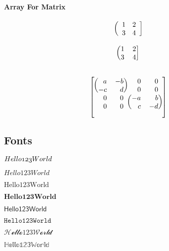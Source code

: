 \paragraph{Array For Matrix}
\[
    \begin{array}({cc}]     %
        1 & 2 \\
        3 & 4
    \end{array}
\]


\[
    \begin{blockarray}{(cc]}    %
        1 & 2 \\
        3 & 4
    \end{blockarray}
\]

\[ \left[
    \begin{blockarray}{*4r}     %
        \begin{block}{(rr)rr}
            a & -b & 0 & 0 \\
            -c & d & 0 & 0 \\
        \end{block}
        \begin{block}{rr(rr)}
            0 & 0 & -a & b \\
            0 & 0 & c & -d \\
        \end{block}
    \end{blockarray}
\right] \]

\subsection{Fonts}
$ \mathnormal{Hello123World} $

$ \mathit{Hello123World} $

$ \mathrm{Hello123World} $

$ \mathbf{Hello123World} $

$ \mathsf{Hello123World} $

$ \mathtt{Hello123World} $

$ \mathcal{Hello123World} $     %

$ \mathbb{Hello123World} $      %

